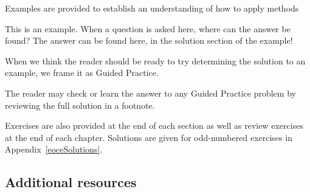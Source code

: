 \noindent%
Examples are provided to establish an understanding of how
to apply methods

\begin{examplewrap}
\begin{nexample}{This is an example.
    When a question is asked here, where can the answer be found?}
  The answer can be found here, in the solution section
  of the example!
\end{nexample}
\end{examplewrap}

\noindent%
When we think the reader should be ready to try determining
the solution to an example, we frame it as Guided Practice.

\begin{exercisewrap}
\begin{nexercise}
The reader may check or learn the answer to any Guided Practice
problem by reviewing the full solution in a footnote.\footnotemark{}
\end{nexercise}
\end{exercisewrap}

\noindent%
Exercises are also provided at the end of each section
as well as review exercises at the end of each chapter.
Solutions are given for odd-numbered exercises in
Appendix~\ref{eoceSolutions}.


\subsection*{{\color{oiB}Additional resources}}

